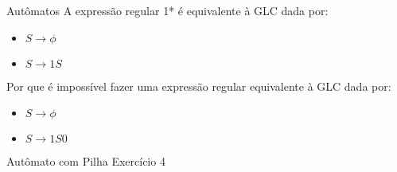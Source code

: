 \documentclass{beamer}
\begin{document}
\begin{frame}{Autômatos}
\Large
\centering
A expressão regular \textsc{1*} é equivalente à GLC dada por:
  \begin{itemize}
    \item $S \rightarrow \phi$
    \item $S \rightarrow 1 S$
  \end{itemize}

Por que é impossível fazer uma expressão regular equivalente à GLC dada por:
  \begin{itemize}
    \item $S \rightarrow \phi$
    \item $S \rightarrow 1 S 0$
  \end{itemize}

\end{frame}

\begin{frame}{Autômato com Pilha}
\Large
\centering
Exercício 4
\end{frame}
\end{document}
